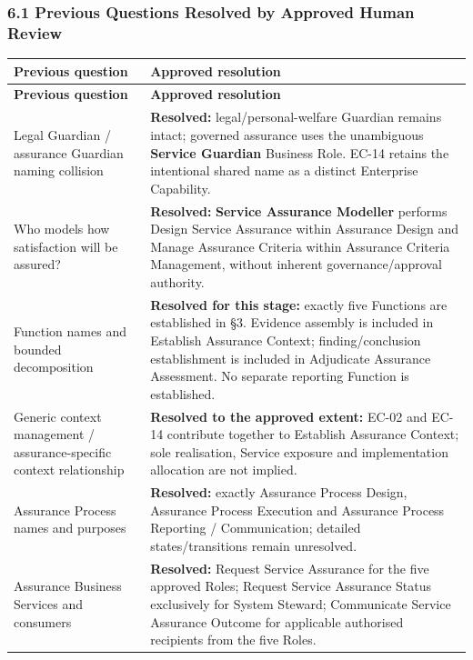 \subsubsection*{6.1 Previous Questions Resolved by Approved Human Review}
\label{rad:assurance:232}
\begingroup\small\setlength{\TableWidth}{\dimexpr\linewidth-4\tabcolsep-3\arrayrulewidth\relax}
\begin{longtable}{|>{\raggedright\arraybackslash}p{0.35\TableWidth}|>{\raggedright\arraybackslash}p{0.65\TableWidth}|}
\hline\rowcolor{TableHead}\textbf{Previous question} & \textbf{Approved resolution}\\\hline\endfirsthead
\hline\rowcolor{TableHead}\textbf{Previous question} & \textbf{Approved resolution}\\\hline\endhead
\hline\endfoot
Legal Guardian /\allowbreak{} assurance Guardian naming collision & \textbf{Resolved:} legal/\allowbreak{}personal-welfare Guardian remains intact; governed assurance uses the unambiguous \textbf{Service Guardian} Business Role. EC-14 retains the intentional shared name as a distinct Enterprise Capability.\\\hline
Who models how satisfaction will be assured? & \textbf{Resolved:} \textbf{Service Assurance Modeller} performs Design Service Assurance within Assurance Design and Manage Assurance Criteria within Assurance Criteria Management, without inherent governance/\allowbreak{}approval authority.\\\hline
Function names and bounded decomposition & \textbf{Resolved for this stage:} exactly five Functions are established in §3. Evidence assembly is included in Establish Assurance Context; finding/\allowbreak{}conclusion establishment is included in Adjudicate Assurance Assessment. No separate reporting Function is established.\\\hline
Generic context management /\allowbreak{} assurance-specific context relationship & \textbf{Resolved to the approved extent:} EC-02 and EC-14 contribute together to Establish Assurance Context; sole realisation, Service exposure and implementation allocation are not implied.\\\hline
Assurance Process names and purposes & \textbf{Resolved:} exactly Assurance Process Design, Assurance Process Execution and Assurance Process Reporting /\allowbreak{} Communication; detailed states/\allowbreak{}transitions remain unresolved.\\\hline
Assurance Business Services and consumers & \textbf{Resolved:} Request Service Assurance for the five approved Roles; Request Service Assurance Status exclusively for System Steward; Communicate Service Assurance Outcome for applicable authorised recipients from the five Roles.\\\hline

\end{longtable}
